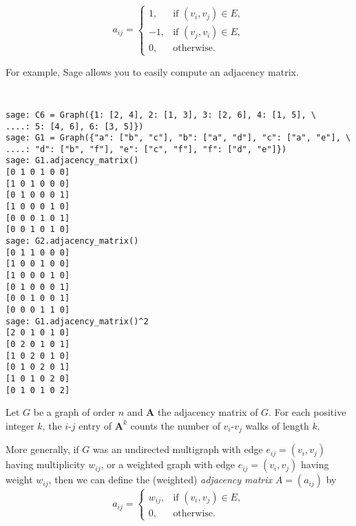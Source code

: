 \[
a_{ij}
=
\begin{cases}
1,  & \text{if $(v_i, v_j) \in E$}, \\
-1, & \text{if $(v_j, v_i) \in E$}, \\
0,  & \text{otherwise}.
\end{cases}
\]

%
%

For example, Sage allows you to easily compute an adjacency matrix.
%
\begin{center}
\fontsize{10pt}{10pt}
\selectfont
\tt
\begin{lstlisting}
sage: C6 = Graph({1: [2, 4], 2: [1, 3], 3: [2, 6], 4: [1, 5], \
....: 5: [4, 6], 6: [3, 5]})
sage: G1 = Graph({"a": ["b", "c"], "b": ["a", "d"], "c": ["a", "e"], \
....: "d": ["b", "f"], "e": ["c", "f"], "f": ["d", "e"]})
sage: G1.adjacency_matrix()
[0 1 0 1 0 0]
[1 0 1 0 0 0]
[0 1 0 0 0 1]
[1 0 0 0 1 0]
[0 0 0 1 0 1]
[0 0 1 0 1 0]
sage: G2.adjacency_matrix()
[0 1 1 0 0 0]
[1 0 0 1 0 0]
[1 0 0 0 1 0]
[0 1 0 0 0 1]
[0 0 1 0 0 1]
[0 0 0 1 1 0]
sage: G1.adjacency_matrix()^2
[2 0 1 0 1 0]
[0 2 0 1 0 1]
[1 0 2 0 1 0]
[0 1 0 2 0 1]
[1 0 1 0 2 0]
[0 1 0 1 0 2]
\end{lstlisting}
\end{center}
%

\begin{theorem}
Let $G$ be a graph of order $n$ and $\mathbf{A}$ the adjacency matrix
of $G$. For each positive integer $k$, the $i$-$j$ entry of
$\mathbf{A}^k$ counts the number of $v_i$-$v_j$ walks of length $k$.
\end{theorem}

More generally, if $G$ was an undirected multigraph 
with edge $e_{ij}=(v_i,v_j)$ having multiplicity $w_{ij}$,
or a weighted graph 
with edge $e_{ij}=(v_i,v_j)$ having weight $w_{ij}$,
then we can define the (weighted) {\it adjacency matrix}
$A = (a_{ij})$ by
\[
a_{ij}
=
\begin{cases}
w_{ij}, & \text{if $(v_i, v_j) \in E$}, \\
0, & \text{otherwise}.
\end{cases}
\]

